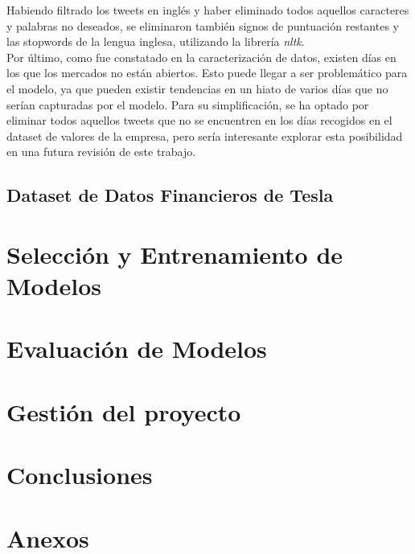 \documentclass[a4paper, 12pt]{report}
\begin{document}
                        Habiendo filtrado los tweets en inglés y haber eliminado todos aquellos caracteres y palabras no deseados, se eliminaron también signos de puntuación restantes 
                        y las stopwords de la lengua inglesa, utilizando la librería \textit{nltk}.\\

                        Por último, como fue constatado en la caracterización de datos, existen días en los que los mercados no están abiertos.
                        Esto puede llegar a ser problemático para el modelo, ya que pueden existir tendencias en un hiato de varios días que no serían capturadas por el modelo. Para su simplificación,
                        se ha optado por eliminar todos aquellos tweets que no se encuentren en los días recogidos en el dataset de valores de la empresa, pero
                        sería interesante explorar esta posibilidad en una futura revisión de este trabajo.\\

                \section{Dataset de Datos Financieros de Tesla}

                        
                        

                        

    \chapter{Selección y Entrenamiento de Modelos}
    \chapter{Evaluación de Modelos}
    \chapter{Gestión del proyecto}
    \chapter{Conclusiones}
    
    
    \chapter{Anexos}
\end{document}

